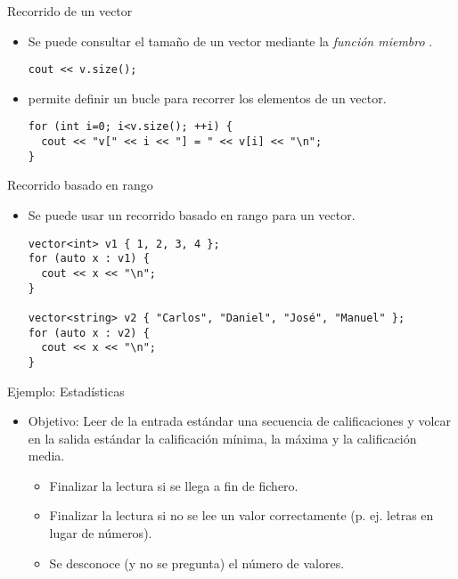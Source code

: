 \begin{frame}[t,fragile]{Recorrido de un vector}
\begin{itemize}
  \item Se puede consultar el tamaño de un vector mediante la \emph{función miembro} .
\begin{lstlisting}
cout << v.size();
\end{lstlisting}

  \vfill
  \item {} permite definir un bucle para recorrer los elementos de un vector.
\begin{lstlisting}
for (int i=0; i<v.size(); ++i) {
  cout << "v[" << i << "] = " << v[i] << "\n";
}
\end{lstlisting}

\end{itemize}
\end{frame}

\begin{frame}[t,fragile]{Recorrido basado en rango}
\begin{itemize}
  \item Se puede usar un recorrido basado en rango para un vector.
\begin{lstlisting}
vector<int> v1 { 1, 2, 3, 4 };
for (auto x : v1) {
  cout << x << "\n";
}

vector<string> v2 { "Carlos", "Daniel", "José", "Manuel" };
for (auto x : v2) {
  cout << x << "\n";
}
\end{lstlisting}
\end{itemize}
\end{frame}

\begin{frame}[t]{Ejemplo: Estadísticas}
\begin{itemize}
  \item \alert{Objetivo}: Leer de la entrada estándar una secuencia de calificaciones
    y volcar en la salida estándar la calificación mínima, la máxima y la calificación media.
    \begin{itemize}
      \item Finalizar la lectura si se llega a fin de fichero.
      \item Finalizar la lectura si no se lee un valor correctamente (p. ej. letras en lugar de números).
      \item Se desconoce (y  no se pregunta) el número de valores.
    \end{itemize}
\end{itemize}
\end{frame}

